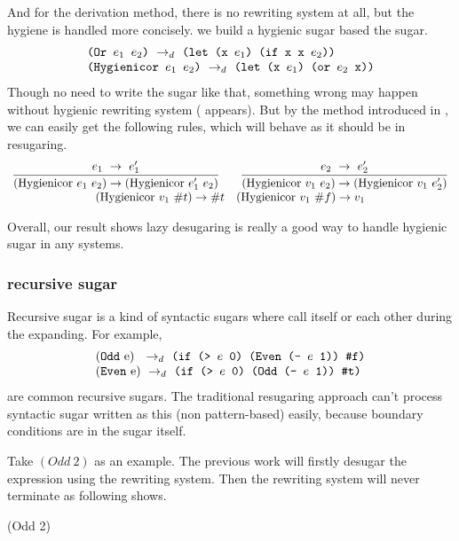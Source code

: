 And for the derivation method, there is no rewriting system at all, but the hygiene is handled more concisely. we build a hygienic sugar  based the  sugar.
\[
\begin{array}{l}
\texttt{(Or $e_1$ $e_2$)} ~\rightarrow_d~ \texttt{(let (x $e_1$) (if x x $e_2$))}\\
\texttt{(Hygienicor $e_1$ $e_2$)} ~\rightarrow_d~ \texttt{(let (x $e_1$) (or $e_2$ x))}
\end{array}
\]
Though no need to write the sugar like that, something wrong may happen without hygienic rewriting system ( appears). But by the method introduced in , we can easily get the following rules, which will behave as it should be in resugaring.
\[
\begin{array}{c}
\infer {(\mbox{Hygienicor}~e_1~e_2) \rightarrow (\mbox{Hygienicor}~e_1'~e_2)} {e_1~ \rightarrow~e_1'}
\qquad
\infer {(\mbox{Hygienicor}~v_1~e_2) \rightarrow (\mbox{Hygienicor}~v_1~e_2')} {e_2~ \rightarrow~e_2'}
\\
(\mbox{Hygienicor}~v_1~\#t) \rightarrow \#t
\quad
(\mbox{Hygienicor}~v_1~\#f) \rightarrow v_1\\
\end{array}
\]

Overall, our result shows lazy desugaring is really a good way to handle hygienic sugar in any systems.

\subsubsection{recursive sugar}
\label{sec:recursiveSugar}

Recursive sugar is a kind of syntactic sugars where call itself or each other during the expanding. For example,
\[
\begin{array}{l}
\drule{(\m{Odd}~$e$)~}{\Code{(if (> $e$ 0) (Even (- $e$ 1)) \false)}}\\
\drule{(\m{Even}~$e$)}{\Code{(if (> $e$ 0) (Odd (- $e$ 1)) \true)}}
\end{array}
\]
are common recursive sugars. The traditional resugaring approach can't process syntactic sugar written as this (non pattern-based) easily, because boundary conditions are in the sugar itself.

Take $(Odd~2)$ as an example. The previous work will firstly desugar the expression using the rewriting system. Then the rewriting system will never terminate as following shows.
\begin{Codes}
   (Odd 2)
\end{Codes}


